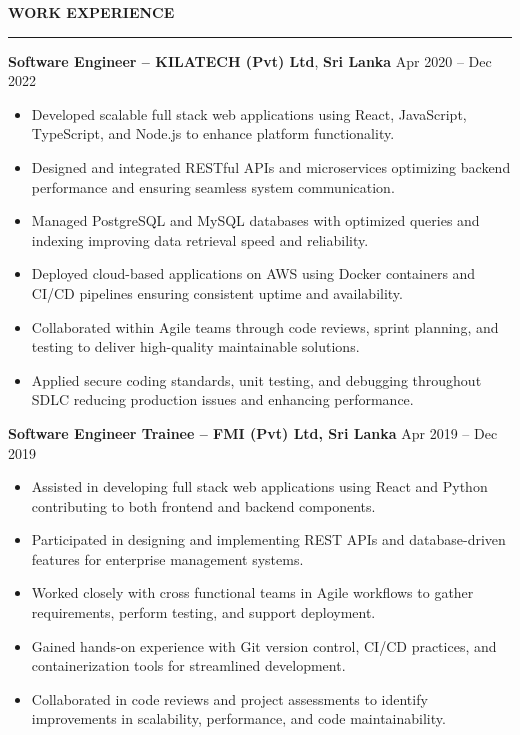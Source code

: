 \documentclass[10pt,letterpaper]{article}
\begin{document}
\vspace{8pt}

\textbf{WORK EXPERIENCE}\\[-8pt]
\noindent\rule{\textwidth}{1pt}

\vspace{-2pt}

\textbf{Software Engineer -- KILATECH (Pvt) Ltd}, \textbf{Sri Lanka} \hfill Apr 2020 -- Dec 2022

\vspace{-1pt}

\begin{itemize}
\item Developed scalable full stack web applications using React, JavaScript, TypeScript, and Node.js to enhance platform functionality.
\item Designed and integrated RESTful APIs and microservices optimizing backend performance and ensuring seamless system communication.
\item Managed PostgreSQL and MySQL databases with optimized queries and indexing improving data retrieval speed and reliability.
\item Deployed cloud-based applications on AWS using Docker containers and CI/CD pipelines ensuring consistent uptime and availability.
\item Collaborated within Agile teams through code reviews, sprint planning, and testing to deliver high-quality maintainable solutions.
\item Applied secure coding standards, unit testing, and debugging throughout SDLC reducing production issues and enhancing performance.
\end{itemize}

\textbf{Software Engineer Trainee -- FMI (Pvt) Ltd, Sri Lanka} \hfill Apr 2019 -- Dec 2019

\vspace{-1pt}

\begin{itemize}
\item Assisted in developing full stack web applications using React and Python contributing to both frontend and backend components.
\item Participated in designing and implementing REST APIs and database-driven features for enterprise management systems.
\item Worked closely with cross functional teams in Agile workflows to gather requirements, perform testing, and support deployment.
\item Gained hands-on experience with Git version control, CI/CD practices, and containerization tools for streamlined development.
\item Collaborated in code reviews and project assessments to identify improvements in scalability, performance, and code maintainability.
\end{itemize}
\end{document}
